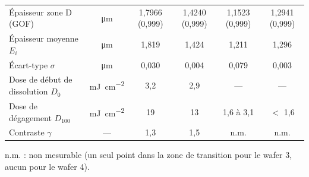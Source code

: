 \begin{table}[H]
\begin{tabularx}{\linewidth}{@{}>{\raggedright\arraybackslash}X c c c c c@{}}
    Épaisseur zone D (GOF) & \unit{\micro\metre} & 1,7966 (0,999) & 1,4240 (0,999) & 1,1523 (0,999) & 1,2941 (0,999) \\
    Épaisseur moyenne $E_i$ & \unit{\micro\metre} & 1,819 & 1,424 & 1,211 & 1,296 \\
    Écart-type $\sigma$ & \unit{\micro\metre} & 0,030 & 0,004 & 0,079 & 0,003 \\
    \midrule
    Dose de début de dissolution $D_0$ & \unit{\milli\joule\per\centi\metre\squared} & 3,2 & 2,9 & --- & --- \\
    Dose de dégagement $D_{100}$ & \unit{\milli\joule\per\centi\metre\squared} & 19 & 13 & 1,6 à 3,1 & $<$ 1,6 \\
    Contraste $\gamma$ & --- & 1,3 & 1,5 & n.m. & n.m. \\
    \bottomrule
  \end{tabularx}

  \vspace{2pt}
  {\scriptsize n.m. : non mesurable (un seul point dans la zone de transition pour le wafer 3, aucun pour le wafer 4).}
\end{table}

